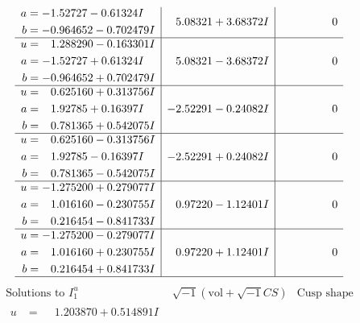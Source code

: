 \documentclass[1p]{elsarticle_modified}
\theoremstyle{definition}
\newcommand{\I}{\sqrt{-1}}
\begin{document}
$$\begin{array}{c|c|c}
\begin{aligned}
a &= -1.52727 - 0.61324 I \\
b &= -0.964652 - 0.702479 I\end{aligned}
 & \phantom{-}5.08321 + 3.68372 I & \phantom{-0.000000 } 0 \\ \hline\begin{aligned}
u &= \phantom{-}1.288290 - 0.163301 I \\
a &= -1.52727 + 0.61324 I \\
b &= -0.964652 + 0.702479 I\end{aligned}
 & \phantom{-}5.08321 - 3.68372 I & \phantom{-0.000000 } 0 \\ \hline\begin{aligned}
u &= \phantom{-}0.625160 + 0.313756 I \\
a &= \phantom{-}1.92785 + 0.16397 I \\
b &= \phantom{-}0.781365 + 0.542075 I\end{aligned}
 & -2.52291 - 0.24082 I & \phantom{-0.000000 } 0 \\ \hline\begin{aligned}
u &= \phantom{-}0.625160 - 0.313756 I \\
a &= \phantom{-}1.92785 - 0.16397 I \\
b &= \phantom{-}0.781365 - 0.542075 I\end{aligned}
 & -2.52291 + 0.24082 I & \phantom{-0.000000 } 0 \\ \hline\begin{aligned}
u &= -1.275200 + 0.279077 I \\
a &= \phantom{-}1.016160 - 0.230755 I \\
b &= \phantom{-}0.216454 - 0.841733 I\end{aligned}
 & \phantom{-}0.97220 - 1.12401 I & \phantom{-0.000000 } 0 \\ \hline\begin{aligned}
u &= -1.275200 - 0.279077 I \\
a &= \phantom{-}1.016160 + 0.230755 I \\
b &= \phantom{-}0.216454 + 0.841733 I\end{aligned}
 & \phantom{-}0.97220 + 1.12401 I & \phantom{-0.000000 } 0\\
 \hline 
 \end{array}$$\newpage$$\begin{array}{c|c|c}  
\text{Solutions to }I^u_{1}& \I (\text{vol} + \sqrt{-1}CS) & \text{Cusp shape}\\
 \hline 
\begin{aligned}
u &= \phantom{-}1.203870 + 0.514891 I \\

\end{aligned}
\end{array}$$
\end{document}
